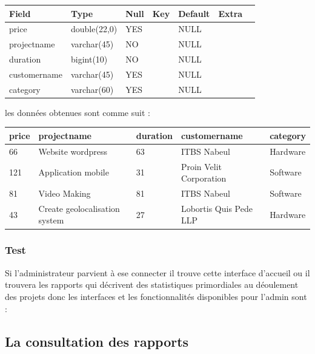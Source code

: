\begin{table}
\centering
\begin{tabular}{|l|l|l|l|l|l|l|}
\hline
Field        & Type         & Null & Key & Default & Extra &   \\
\hline
price        & double(22,0) & YES  &     & NULL    &       &   \\
\hline
projectname  & varchar(45)  & NO   &     & NULL    &       &   \\
\hline
duration     & bigint(10)   & NO   &     & NULL    &       &   \\
\hline
customername & varchar(45)  & YES  &     & NULL    &       &   \\
\hline
category     & varchar(60)  & YES  &     & NULL    &       &   \\
\hline
\end{tabular}
\end{table}


\FloatBarrier
les donn\'{e}es obtenues sont comme suit :
\begin{table}
\centering
\begin{tabular}{|l|l|l|l|l|}
\hline
price & projectname                   & duration & customername            & category  \\
\hline
66    & Website wordpress             & 63       & ITBS Nabeul             & Hardware  \\
\hline
121   & Application mobile            & 31       & Proin Velit Corporation & Software  \\
\hline
81    & Video Making                  & 81       & ITBS Nabeul             & Software  \\
\hline
43    & Create geolocalisation system & 27       & Lobortis Quis Pede LLP  & Hardware  \\
\hline
\end{tabular}
\end{table}

\FloatBarrier


\subsubsection{Test}

Si l'administrateur parvient \`{a} ese connecter il trouve cette interface d'accueil
ou il trouvera les rapports qui d\'{e}crivent des statistiques primordiales au
d\'{e}oulement des projets donc les interfaces et les fonctionnalit\'{e}s disponibles
pour l'admin sont :

\subsection{La consultation des rapports}


